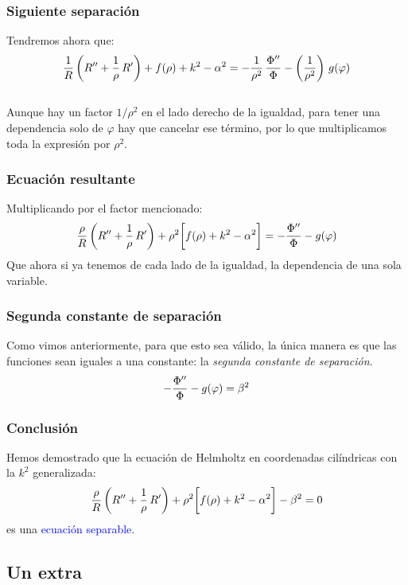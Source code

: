 \documentclass[12pt]{beamer}
\begin{document}
\begin{frame}
\frametitle{Siguiente separación}
Tendremos ahora que:
\pause
\begin{align*}
\dfrac{1}{R} \left( {R}^{\prime \prime} + \dfrac{1}{\rho} \, {R}^{\prime} \right) + f(\rho) + k^{2} - \alpha^{2} = - \dfrac{1}{\rho^{2}} \, \dfrac{{\Phi}^{\prime \prime}}{\Phi} - \left( \dfrac{1}{\rho^{2}} \right) \, g(\varphi)
\end{align*}
\\
\bigskip
\pause
Aunque hay un factor $1/\rho^{2}$ en el lado derecho de la igualdad, para tener una dependencia solo de $\varphi$ hay que cancelar ese término, \pause por lo que multiplicamos toda la expresión por $\rho^{2}$.
\end{frame}
\begin{frame}
\frametitle{Ecuación resultante}
Multiplicando por el factor mencionado:
\pause
\begin{align*}
\dfrac{\rho}{R} \left( {R}^{\prime \prime} + \dfrac{1}{\rho} \, {R}^{\prime} \right) + \rho^{2} \bigg[ f(\rho) + k^{2} - \alpha^{2} \bigg] = - \dfrac{{\Phi}^{\prime \prime}}{\Phi} - g(\varphi)
\end{align*}
\pause
Que ahora si ya tenemos de cada lado de la igualdad, la dependencia de una sola variable.
\end{frame}
\begin{frame}
\frametitle{Segunda constante de separación}
Como vimos anteriormente, para que esto sea válido, la única manera es que las funciones sean iguales a una constante: \pause la \emph{segunda constante de separación}.
\pause
\begin{align*}
- \dfrac{{\Phi}^{\prime \prime}}{\Phi} - g(\varphi) = \beta^{2}
\end{align*}
\end{frame}
\begin{frame}
\frametitle{Conclusión}
Hemos demostrado que la ecuación de Helmholtz en coordenadas cilíndricas con la $k^{2}$ generalizada:
\pause
\begin{align*}
\dfrac{\rho}{R} \left( {R}^{\prime \prime} + \dfrac{1}{\rho} \, {R}^{\prime} \right) + \rho^{2} \bigg[ f(\rho) + k^{2} - \alpha^{2} \bigg] - \beta^{2} = 0
\end{align*}
\pause
es una \textcolor{blue}{ecuación separable}.
\end{frame}

\subsection{Un extra}
\end{document}

